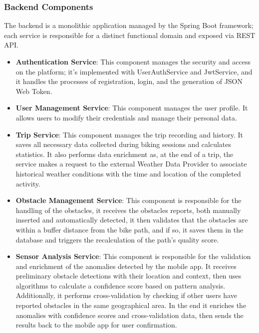 \subsubsection{Backend Components}
The backend is a monolithic application managed by the Spring Boot framework; each service is responsible for a distinct functional domain and exposed via REST API.

\begin{itemize}
    \item \textbf{Authentication Service}: This component manages the security and access on the platform; it's implemented with UserAuthService and JwtService, and it handles the processes of registration, login, and the generation of JSON Web Token.
    
    \item \textbf{User Management Service}: This component manages the user profile. It allows users to modify their credentials and manage their personal data.
    
    \item \textbf{Trip Service}: This component manages the trip recording and history. It saves all necessary data collected during biking sessions and calculates statistics. It also performs data enrichment as, at the end of a trip, the service makes a request to the external Weather Data Provider to associate historical weather conditions with the time and location of the completed activity.
    
    \item \textbf{Obstacle Management Service}: This component is responsible for the handling of the obstacles, it receives the obstacles reports, both manually inserted and automatically detected, it then validates that the obstacles are within a buffer distance from the bike path, and if so, it saves them in the database and triggers the recalculation of the path's quality score.

    \item \textbf{Sensor Analysis Service}: This component is responsible for the validation and enrichment of the anomalies detected by the mobile app. It receives preliminary obstacle detections with their location and context, then uses algorithms to calculate a confidence score based on pattern analysis. Additionally, it performs cross-validation by checking if other users have reported obstacles in the same geographical area. In the end it enriches the anomalies with confidence scores and cross-validation data, then sends the results back to the mobile app for user confirmation.
    

\end{itemize}
